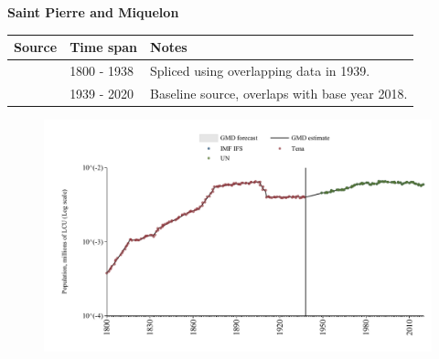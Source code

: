 \documentclass[12pt,a4paper,landscape]{article}
\begin{document}
\begin{adjustbox}{max totalsize={\paperwidth}{\paperheight},center}
\begin{minipage}[t][\textheight][t]{\textwidth}
\vspace*{0.5cm}
{}
\begin{center}
{\Large\bfseries Saint Pierre and Miquelon}
\end{center}
\vspace{0.5cm}
\begin{table}[H]
\centering
\small
\begin{tabular}{|l|l|l|}
\hline
\textbf{Source} & \textbf{Time span} & \textbf{Notes} \\
\hline
\rowcolor{white}\cite{Tena}& 1800 - 1938 &Spliced using overlapping data in 1939.\\
\rowcolor{lightgray}\cite{IMF_IFS}& 1939 - 2020 &Baseline source, overlaps with base year 2018.\\
\hline
\end{tabular}
\end{table}
\begin{figure}[H]
\centering
\includegraphics[width=\textwidth,height=0.6\textheight,keepaspectratio]{graphs/SPM_pop.pdf}
\end{figure}
\end{minipage}
\end{adjustbox}
\end{document}
